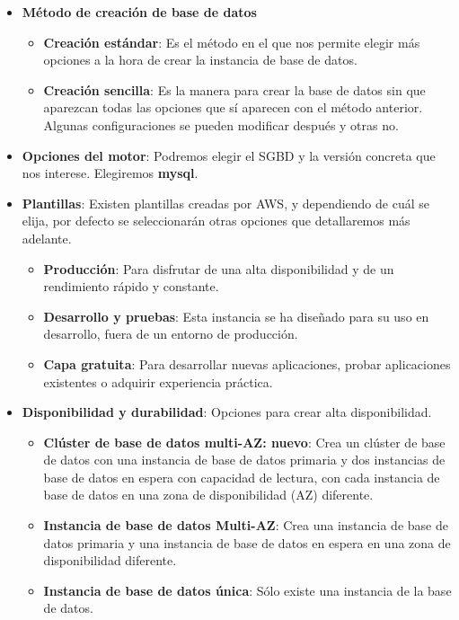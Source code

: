 \begin{itemize}
	\item \textbf{Método de creación de base de datos}
	\begin{itemize}
		\item \textbf{Creación estándar}: Es el método en el que nos permite elegir más opciones a la hora de crear la instancia de base de datos.
		\item \textbf{Creación sencilla}: Es la manera para crear la base de datos sin que aparezcan todas las opciones que sí aparecen con el método anterior. Algunas configuraciones se pueden modificar después y otras no.
	\end{itemize}
	
	\item \textbf{Opciones del motor}: Podremos elegir el SGBD y la versión concreta que nos interese. Elegiremos \textbf{mysql}.
	
	\item \textbf{Plantillas}: Existen plantillas creadas por AWS, y dependiendo de cuál se elija, por defecto se seleccionarán otras opciones que detallaremos más adelante.
	\begin{itemize}
		\item \textbf{Producción}: Para disfrutar de una alta disponibilidad y de un rendimiento rápido y constante.
		\item \textbf{Desarrollo y pruebas}: Esta instancia se ha diseñado para su uso en desarrollo, fuera de un entorno de producción.
		\item \textbf{Capa gratuita}: Para desarrollar nuevas aplicaciones, probar aplicaciones existentes o adquirir experiencia práctica.
	\end{itemize}
	
	\item \textbf{Disponibilidad y durabilidad}: Opciones para crear alta disponibilidad.
	\begin{itemize}
		\item \textbf{Clúster de base de datos multi-AZ: nuevo}: Crea un clúster de base de datos con una instancia de base de datos primaria y dos instancias de base de datos en espera con capacidad de lectura, con cada instancia de base de datos en una zona de disponibilidad (AZ) diferente.
		\item \textbf{Instancia de base de datos Multi-AZ}: Crea una instancia de base de datos primaria y una instancia de base de datos en espera en una zona de disponibilidad diferente.
		\item \textbf{Instancia de base de datos única}: Sólo existe una instancia de la base de datos.
	\end{itemize}
	

\end{itemize}
